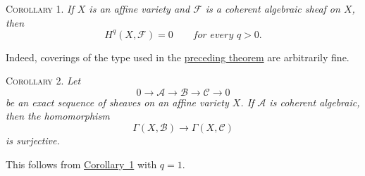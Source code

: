 \label{fac:II:3:no:46:thm:3:cor:1}
\textsc{Corollary 1.} \textit{If $X$ is an affine variety and $\mathcal{F}$ is a coherent algebraic sheaf on $X$, then}
\[
H^q(X,\mathcal{F})=0
\qquad\textit{for every $q>0$.}
\]

Indeed, coverings of the type used in the \hyperref[fac:II:3:no:46:thm:3]{preceding theorem} are arbitrarily fine.

\label{fac:II:3:no:46:thm:3:cor:2}
\textsc{Corollary 2.} \textit{Let}
\[
0\longrightarrow\mathcal{A}
\longrightarrow\mathcal{B}
\longrightarrow\mathcal{C}
\longrightarrow0
\]
\textit{be an exact sequence of sheaves on an affine variety $X$. If $\mathcal{A}$ is coherent algebraic, then the homomorphism}
\[
\Gamma(X,\mathcal{B})\longrightarrow\Gamma(X,\mathcal{C})
\]
\textit{is surjective.}

This follows from \hyperref[fac:II:3:no:46:thm:3:cor:1]{Corollary~1} with $q=1$.
